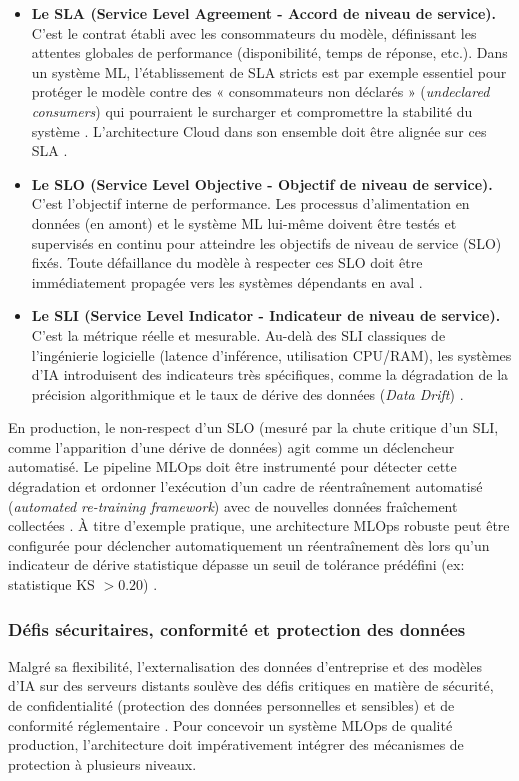 \begin{itemize}
    \item[$\bullet$] \textbf{Le SLA (Service Level Agreement - Accord de niveau de service).} C'est le contrat établi avec les consommateurs du modèle, définissant les attentes globales de performance (disponibilité, temps de réponse, etc.). Dans un système ML, l'établissement de SLA stricts est par exemple essentiel pour protéger le modèle contre des « consommateurs non déclarés » (\textit{undeclared consumers}) qui pourraient le surcharger et compromettre la stabilité du système \cite{82}. L'architecture Cloud dans son ensemble doit être alignée sur ces SLA \cite{43}.
    \item[$\bullet$] \textbf{Le SLO (Service Level Objective - Objectif de niveau de service).} C'est l'objectif interne de performance. Les processus d'alimentation en données (en amont) et le système ML lui-même doivent être testés et supervisés en continu pour atteindre les objectifs de niveau de service (SLO) fixés. Toute défaillance du modèle à respecter ces SLO doit être immédiatement propagée vers les systèmes dépendants en aval \cite{82}.
    \item[$\bullet$] \textbf{Le SLI (Service Level Indicator - Indicateur de niveau de service).} C'est la métrique réelle et mesurable. Au-delà des SLI classiques de l'ingénierie logicielle (latence d'inférence, utilisation CPU/RAM), les systèmes d'IA introduisent des indicateurs très spécifiques, comme la dégradation de la précision algorithmique et le taux de dérive des données (\textit{Data Drift}) \cite{43, 74}.
\end{itemize}

En production, le non-respect d'un SLO (mesuré par la chute critique d'un SLI, comme l'apparition d'une dérive de données) agit comme un déclencheur automatisé. Le pipeline MLOps doit être instrumenté pour détecter cette dégradation et ordonner l'exécution d'un cadre de réentraînement automatisé (\textit{automated re-training framework}) avec de nouvelles données fraîchement collectées \cite{43, 74}. À titre d'exemple pratique, une architecture MLOps robuste peut être configurée pour déclencher automatiquement un réentraînement dès lors qu'un indicateur de dérive statistique dépasse un seuil de tolérance prédéfini (ex: statistique KS $> 0.20$) \cite{80}.

\subsubsection{Défis sécuritaires, conformité et protection des données}
Malgré sa flexibilité, l'externalisation des données d'entreprise et des modèles d'IA sur des serveurs distants soulève des défis critiques en matière de sécurité, de confidentialité (protection des données personnelles et sensibles) et de conformité réglementaire \cite{43}. Pour concevoir un système MLOps de qualité production, l'architecture doit impérativement intégrer des mécanismes de protection à plusieurs niveaux.

